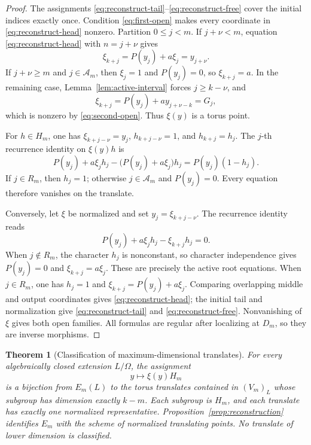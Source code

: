 \documentclass[11pt]{article}
\newcommand{\Om}{\Omega}
\newtheorem{theorem}[lemma]{Theorem}
\theoremstyle{remark}
\numberwithin{equation}{section}
\begin{document}
\begin{proof}
The assignments \eqref{eq:reconstruct-tail}--\eqref{eq:reconstruct-free} cover the initial indices exactly once.  Condition \eqref{eq:first-open} makes every coordinate in \eqref{eq:reconstruct-head} nonzero.  Partition \(0\leq j<m\).  If \(j+\nu<m\), equation \eqref{eq:reconstruct-head} with \(n=j+\nu\) gives
\[
 \xi_{k+j}=P(y_j)+a\xi_j=y_{j+\nu}.
\]
If \(j+\nu\geq m\) and \(j\in\mathcal A_m\), then \(\xi_j=1\) and \(P(y_j)=0\), so \(\xi_{k+j}=a\).  In the remaining case, Lemma~\ref{lem:active-interval} forces \(j\geq k-\nu\), and
\[
 \xi_{k+j}=P(y_j)+a y_{j+\nu-k}=G_j,
\]
which is nonzero by \eqref{eq:second-open}.  Thus \(\xi(y)\) is a torus point.

For \(h\in H_m\), one has \(\xi_{k+j-\nu}=y_j\), \(h_{k+j-\nu}=1\), and \(h_{k+j}=h_j\).  The \(j\)-th recurrence identity on \(\xi(y)h\) is
\[
 P(y_j)+a\xi_jh_j-\bigl(P(y_j)+a\xi_j\bigr)h_j
 =P(y_j)(1-h_j).
\]
If \(j\in R_m\), then \(h_j=1\); otherwise \(j\in\mathcal A_m\) and \(P(y_j)=0\).  Every equation therefore vanishes on the translate.

Conversely, let \(\xi\) be normalized and set \(y_j=\xi_{k+j-\nu}\).  The recurrence identity reads
\[
 P(y_j)+a\xi_jh_j-\xi_{k+j}h_j=0.
\]
When \(j\notin R_m\), the character \(h_j\) is nonconstant, so character independence gives \(P(y_j)=0\) and \(\xi_{k+j}=a\xi_j\).  These are precisely the active root equations.  When \(j\in R_m\), one has \(h_j=1\) and \(\xi_{k+j}=P(y_j)+a\xi_j\).  Comparing overlapping middle and output coordinates gives \eqref{eq:reconstruct-head}; the initial tail and normalization give \eqref{eq:reconstruct-tail} and \eqref{eq:reconstruct-free}.  Nonvanishing of \(\xi\) gives both open families.  All formulas are regular after localizing at \(D_m\), so they are inverse morphisms.
\end{proof}

\begin{theorem}[Classification of maximum-dimensional translates]\label{thm:normalized-classification}
For every algebraically closed extension \(L/\Om\), the assignment
\[
 y\longmapsto\xi(y)H_m
\]
is a bijection from \(E_m(L)\) to the torus translates contained in \((V_m)_L\) whose subgroup has dimension exactly \(k-m\).  Each subgroup is \(H_m\), and each translate has exactly one normalized representative.  Proposition~\ref{prop:reconstruction} identifies \(E_m\) with the scheme of normalized translating points.  No translate of lower dimension is classified.
\end{theorem}
\end{document}
